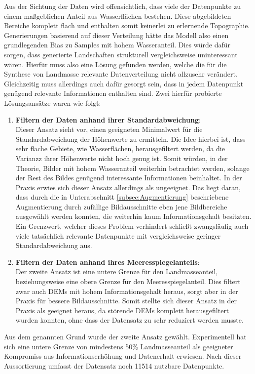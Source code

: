 Aus der Sichtung der Daten wird offensichtlich, dass viele der Datenpunkte zu einem maßgeblichen Anteil aus Wasserflächen bestehen. Diese abgebildeten Bereiche komplett flach und enthalten somit keinerlei zu erlernende Topographie. Generierungen basierend auf dieser Verteilung hätte das Modell also einen grundlegenden Bias zu Samples mit hohem Wasseranteil. Dies würde dafür sorgen, dass generierte Landschaften strukturell vergleichsweise uninteressant wären. Hierfür muss also eine Lösung gefunden werden, welche die für die Synthese von Landmasse relevante Datenverteilung nicht allzusehr verändert. Gleichzeitig muss allerdings auch dafür gesorgt sein, dass in jedem Datenpunkt genügend relevante Informationen enthalten sind. Zwei hierfür probierte Lösungsansätze waren wie folgt:
\begin{enumerate}
    \item \textbf{Filtern der Daten anhand ihrer Standardabweichung}: \\
    Dieser Ansatz sieht vor, einen geeigneten Minimalwert für die Standardabweichung der Höhenwerte zu ermitteln. Die Idee hierbei ist, dass sehr flache Gebiete, wie Wasserflächen, herausgefiltert werden, da die Varianzz ihrer Höhenwerte nicht hoch genug ist. Somit würden, in der Theorie, Bilder mit hohem Wasseranteil weiterhin betrachtet werden, solange der Rest des Bildes genügend interessante Informationen beinhaltet. In der Praxis erwies sich dieser Ansatz allerdings als ungeeignet. Das liegt daran, dass durch die in Unterabschnitt \ref{subsec:Augmentierung} beschriebene Augmentierung durch zufällige Bildausschnitte eben jene Bildbereiche ausgewählt werden konnten, die weiterhin kaum Informationsgehalt besitzten. Ein Grenzwert, welcher dieses Problem verhindert schließt zwangsläufig auch viele tatsächlich relevante Datenpunkte mit vergleichsweise geringer Standardabweichung aus.
    \item \textbf{Filtern der Daten anhand ihres Meeresspiegelanteils}: \\
    Der zweite Ansatz ist eine untere Grenze für den Landmasseanteil, beziehungsweise eine obere Grenze für den Meeresspiegelanteil. Dies filtert zwar auch \ac{DEM}s mit hohem Informationsgehalt heraus, sorgt aber in der Praxis für bessere Bildausschnitte. Somit stellte sich dieser Ansatz in der Praxis als geeignet heraus, da störende DEMs komplett herausgefiltert wurden konnten, ohne dass der Datensatz zu sehr reduziert werden musste.
\end{enumerate}
Aus dem genannten Grund wurde der zweite Ansatz gewählt. Experimentell hat sich eine untere Grenze von mindestens 50\% Landmasseanteil als geeigneter Kompromiss aus Informationserhöhung und Datenerhalt erwiesen. Nach dieser Aussortierung umfasst der Datensatz noch 11514 nutzbare Datenpunkte.

